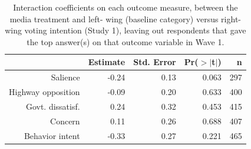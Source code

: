 \begin{table}[ht]
\centering
\caption{Interaction coefficients on each outcome measure, between the media treatment and left-
                      wing (baseline category) versus right-wing voting intention (Study 1),
                      leaving out respondents that gave the top answer(s) on that outcome variable in Wave 1.} 
\label{tab:disruption_noceiling_pol}
\begin{tabular}{rrrrr}
  \hline
 & Estimate & Std. Error & Pr($>$$|$t$|$) & n \\ 
  \hline
Salience & -0.24 & 0.13 & 0.063 & 297 \\ 
  Highway opposition & -0.09 & 0.20 & 0.633 & 400 \\ 
  Govt. dissatisf. & 0.24 & 0.32 & 0.453 & 415 \\ 
  Concern & 0.11 & 0.26 & 0.688 & 407 \\ 
  Behavior intent & -0.33 & 0.27 & 0.221 & 465 \\ 
   \hline
\end{tabular}
\end{table}
